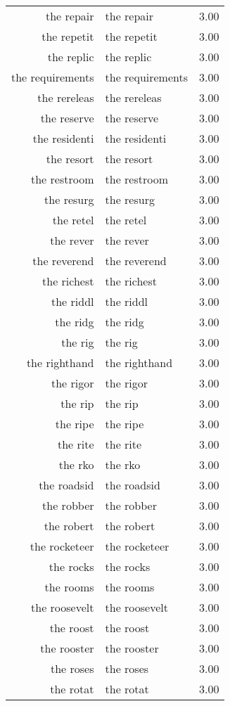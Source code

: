 \begin{table}[ht]
\begin{tabular}{rlr}
  the repair & the repair & 3.00 \\ 
  the repetit & the repetit & 3.00 \\ 
  the replic & the replic & 3.00 \\ 
  the requirements & the requirements & 3.00 \\ 
  the rereleas & the rereleas & 3.00 \\ 
  the reserve & the reserve & 3.00 \\ 
  the residenti & the residenti & 3.00 \\ 
  the resort & the resort & 3.00 \\ 
  the restroom & the restroom & 3.00 \\ 
  the resurg & the resurg & 3.00 \\ 
  the retel & the retel & 3.00 \\ 
  the rever & the rever & 3.00 \\ 
  the reverend & the reverend & 3.00 \\ 
  the richest & the richest & 3.00 \\ 
  the riddl & the riddl & 3.00 \\ 
  the ridg & the ridg & 3.00 \\ 
  the rig & the rig & 3.00 \\ 
  the righthand & the righthand & 3.00 \\ 
  the rigor & the rigor & 3.00 \\ 
  the rip & the rip & 3.00 \\ 
  the ripe & the ripe & 3.00 \\ 
  the rite & the rite & 3.00 \\ 
  the rko & the rko & 3.00 \\ 
  the roadsid & the roadsid & 3.00 \\ 
  the robber & the robber & 3.00 \\ 
  the robert & the robert & 3.00 \\ 
  the rocketeer & the rocketeer & 3.00 \\ 
  the rocks & the rocks & 3.00 \\ 
  the rooms & the rooms & 3.00 \\ 
  the roosevelt & the roosevelt & 3.00 \\ 
  the roost & the roost & 3.00 \\ 
  the rooster & the rooster & 3.00 \\ 
  the roses & the roses & 3.00 \\ 
  the rotat & the rotat & 3.00 \\ 

\end{tabular}
\end{table}
